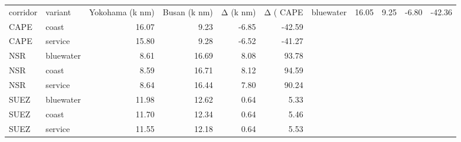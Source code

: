 \begin{tabular}{llrrrr}
\toprule
corridor &   variant &  Yokohama (k nm) &  Busan (k nm) &  Δ (k nm) &  Δ (%
\midrule
    CAPE & bluewater &            16.05 &          9.25 &     -6.80 & -42.36 \\
    CAPE &     coast &            16.07 &          9.23 &     -6.85 & -42.59 \\
    CAPE &   service &            15.80 &          9.28 &     -6.52 & -41.27 \\
     NSR & bluewater &             8.61 &         16.69 &      8.08 &  93.78 \\
     NSR &     coast &             8.59 &         16.71 &      8.12 &  94.59 \\
     NSR &   service &             8.64 &         16.44 &      7.80 &  90.24 \\
    SUEZ & bluewater &            11.98 &         12.62 &      0.64 &   5.33 \\
    SUEZ &     coast &            11.70 &         12.34 &      0.64 &   5.46 \\
    SUEZ &   service &            11.55 &         12.18 &      0.64 &   5.53 \\
\bottomrule
\end{tabular}
